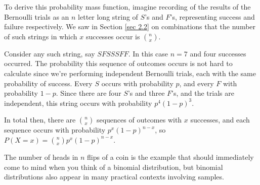 \par
To derive this probability mass function, imagine recording of the results of the Bernoulli trials as an $n$ letter long string of $S$'s and $F$'s, representing success and failure respectively. We saw in Section \ref{sec 2.2} on combinations that the number of such strings in which $x$ successes occur is $\binom{n}{x}$.
\par
Consider any such string, say $SFSSSFF$. In this case $n=7$ and four successes occurred. The probability this sequence of outcomes occurs is not hard to calculate since we're performing independent Bernoulli trials, each with the same probability of success. Every $S$ occurs with probability $p$, and every $F$ with probability $1-p$. Since there are four $S$'s and three $F$'s, and the trials are independent, this string occurs with probability $p^4(1-p)^3$.
\par
In total then, there are $\binom{n}{x}$ sequences of outcomes with $x$ successes, and each sequence occurs with probability $p^x(1-p)^{n-x}$, so $P(X = x) = \binom{n}{x}p^x(1-p)^{n-x}$.
\par
The number of heads in $n$ flips of a coin is the example that should immediately come to mind when you think of a binomial distribution, but binomial distributions also appear in many practical contexts involving samples.

